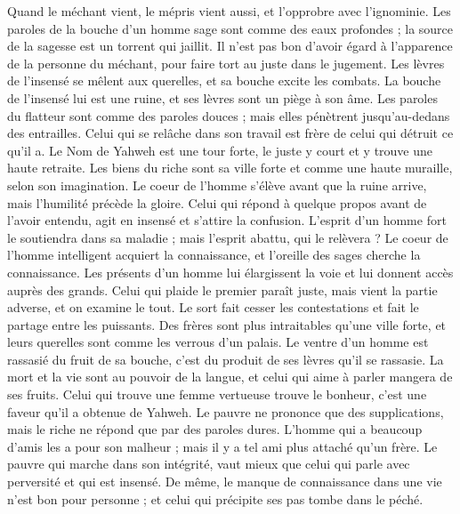 \begin{multicols}{2}
Quand le méchant vient, le mépris vient aussi, et l'opprobre avec l'ignominie.
Les paroles de la bouche d'un homme sage sont comme des eaux profondes ; la source de la sagesse est un torrent qui jaillit.
Il n'est pas bon d'avoir égard à l'apparence de la personne du méchant, pour faire tort au juste dans le jugement.
Les lèvres de l'insensé se mêlent aux querelles, et sa bouche excite les combats.
La bouche de l'insensé lui est une ruine, et ses lèvres sont un piège à son âme.
Les paroles du flatteur sont comme des paroles douces ; mais elles pénètrent jusqu'au-dedans des entrailles.
Celui qui se relâche dans son travail est frère de celui qui détruit ce qu'il a.
Le Nom de Yahweh est une tour forte, le juste y court et y trouve une haute retraite.
Les biens du riche sont sa ville forte et comme une haute muraille, selon son imagination.
Le coeur de l'homme s'élève avant que la ruine arrive, mais l'humilité précède la gloire.
Celui qui répond à quelque propos avant de l'avoir entendu, agit en insensé et s'attire la confusion.
L'esprit d'un homme fort le soutiendra dans sa maladie ; mais l'esprit abattu, qui le relèvera ?
Le coeur de l'homme intelligent acquiert la connaissance, et l'oreille des sages cherche la connaissance.
Les présents d'un homme lui élargissent la voie et lui donnent accès auprès des grands.
Celui qui plaide le premier paraît juste, mais vient la partie adverse, et on examine le tout.
Le sort fait cesser les contestations et fait le partage entre les puissants.
Des frères sont plus intraitables qu'une ville forte, et leurs querelles sont comme les verrous d'un palais.
Le ventre d'un homme est rassasié du fruit de sa bouche, c'est du produit de ses lèvres qu'il se rassasie.
La mort et la vie sont au pouvoir de la langue, et celui qui aime à parler mangera de ses fruits.
Celui qui trouve une femme vertueuse trouve le bonheur, c'est une faveur qu'il a obtenue de Yahweh.
Le pauvre ne prononce que des supplications, mais le riche ne répond que par des paroles dures.
L'homme qui a beaucoup d'amis les a pour son malheur ; mais il y a tel ami plus attaché qu'un frère.
\VerseOne{}Le pauvre qui marche dans son intégrité, vaut mieux que celui qui parle avec perversité et qui est insensé.
De même, le manque de connaissance dans une vie n'est bon pour personne ; et celui qui précipite ses pas tombe dans le péché.

\end{multicols}
